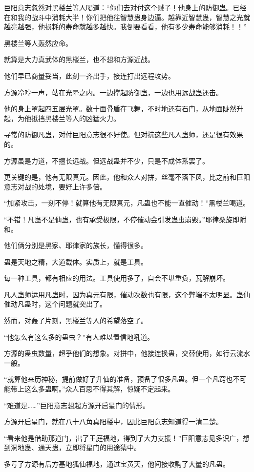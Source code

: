 \begin{this_body}
巨阳意志忽然对黑楼兰等人喝道：“你们去对付这个贼子！他身上的防御蛊。已经在和我的战斗中消耗大半！你们把他往智慧蛊身边逼。越靠近智慧蛊，智慧之光就越亮越强，他损耗的寿命就越多越快。我倒要看看，他有多少寿命能够消耗！！”

黑楼兰等人轰然应命。

就算是大力真武体的黑楼兰，也不想和方源近战。

他们早已商量妥当，此刻一齐出手，接连打出远程攻势。

方源冷哼一声，站在光晕之内。一边撑起防御蛊，一边也用远战蛊还击。

他的身上罩起四五层光罩。数十面骨盾在飞舞，不时地还有石门，从地面陡然升起，为他抵挡黑楼兰等人的凶猛火力。

寻常的防御凡蛊，对付巨阳意志很不好使。但对抗这些凡人蛊师，还是很有效果的。

方源虽是力道，不擅长远战。但远战蛊并不少，只是不成体系罢了。

更关键的是，他有无限真元。因此，他和众人对拼，丝毫不落下风，比之前和巨阳意志对战的处境，要好上许多倍。

“加紧攻击，一刻不停！就算他有无限真元，凡蛊也不能一直催动！”黑楼兰喝道。

“不错！凡蛊不是仙蛊，也有承受极限，不停催动会引发蛊虫崩毁。”耶律桑旋即附和。

他们俩分别是黑家、耶律家的族长，懂得很多。

蛊是天地之精，大道载体。实质上，就是工具。

每一种工具，都有相应的用法。工具使用多了，自会不堪重负，瓦解崩坏。

凡人蛊师运用凡蛊时，因为真元有限，催动次数也有限，这个弊端不太明显。蛊仙催动凡蛊时，这个问题就突出了。

然而，对轰了片刻，黑楼兰等人的希望落空了。

“他怎么有这么多的蛊虫？”有人难以置信地吼道。

方源的蛊虫数量，超乎他们的想象。对拼中，他接连换蛊，交替使用，如行云流水一般。

“就算他来历神秘，提前做好了升仙的准备，预备了很多凡蛊。但一个凡窍也不可能带上这么多蛊啊。”众人百思不得其解，惊疑不定起来。

“难道是……”巨阳意志想起方源开启星门的情形。

方源开启星门，就在八十八角真阳楼中，因此巨阳意志知道得一清二楚。

“看来他是借助那道门，出了王庭福地，得到了大力支援！”巨阳意志见多识广，想到洞地蛊、通天蛊，立即将星门的用途猜中。

多亏了方源有后方基地狐仙福地，通过宝黄天，他间接收购了大量的凡蛊。


\end{this_body}
